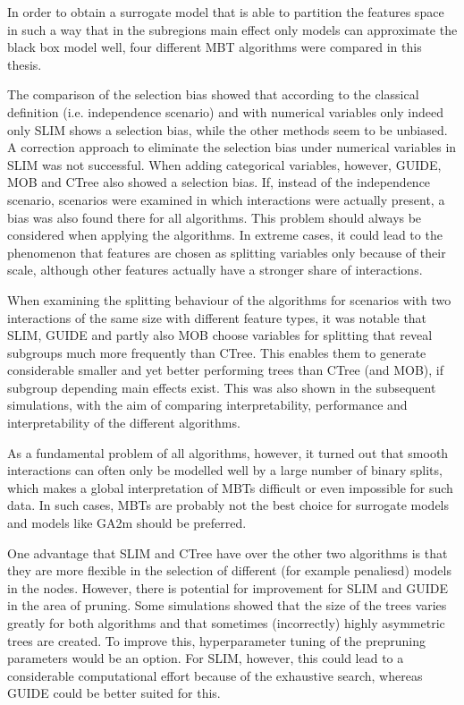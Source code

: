 In order to obtain a surrogate model that is able to partition the features space in such a way that in the subregions main effect only models can approximate the black box model well, four different MBT algorithms were compared in this thesis.

The comparison of the selection bias showed that according to the classical definition (i.e. independence scenario) and with numerical variables only indeed only SLIM shows a selection bias, while the other methods seem to be unbiased. A correction approach to eliminate the selection bias under numerical variables in SLIM was not successful.
When adding categorical variables, however, GUIDE, MOB and CTree also showed a selection bias. If, instead of the independence scenario, scenarios were examined in which interactions were actually present, a bias was also found there for all algorithms.
This problem should always be considered when applying the algorithms. In extreme cases, it could lead to the phenomenon that features are chosen as splitting variables only because of their scale, although other features actually have a stronger share of interactions.

When examining the splitting behaviour of the algorithms for scenarios with two interactions of the same size with different feature types, it was notable that SLIM, GUIDE and partly also MOB choose variables for splitting that reveal subgroups much more frequently than CTree. This enables them to generate considerable smaller and yet better performing trees than CTree (and MOB), if subgroup depending main effects exist.
This was also shown in the subsequent simulations, with the aim of comparing interpretability, performance and interpretability of the different algorithms. 

As a fundamental problem of all algorithms, however, it turned out that smooth interactions can often only be modelled well by a large number of binary splits, which makes a global interpretation of MBTs difficult or even impossible for such data. In such cases, MBTs are probably not the best choice for surrogate models and models like GA2m\citep{Lou.2013} should be preferred.


One advantage that SLIM and CTree have over the other two algorithms is that they are more flexible in the selection of different (for example penaliesd) models in the nodes.
However, there is potential for improvement for SLIM and GUIDE in the area of pruning. Some simulations showed that the size of the trees varies greatly for both algorithms and that sometimes (incorrectly) highly asymmetric trees are created. To improve this, hyperparameter tuning of the prepruning parameters would be an option. For SLIM, however, this could lead to a considerable computational effort because of the exhaustive search, whereas GUIDE could be better suited for this.

